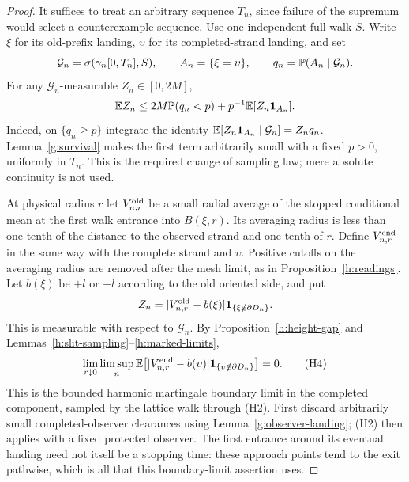 \begin{proof}
It suffices to treat an arbitrary sequence $T_n$, since failure of the
supremum would select a counterexample sequence. Use one independent
full walk $S$. Write $\xi$ for its old-prefix landing, $\upsilon$
for its completed-strand landing, and set
\[
 \mathcal G_n=\sigma(\gamma_n[0,T_n],S),\qquad
 A_n=\{\xi=\upsilon\},\qquad
 q_n=\mathbb P(A_n\mid\mathcal G_n).
\]
For any $\mathcal G_n$-measurable $Z_n\in[0,2M]$,
\begin{equation}\label{h:reweight}
 \mathbb E Z_n\le 2M\mathbb P(q_n<p)+p^{-1}\mathbb E[Z_n\mathbf1_{A_n}].
\end{equation}
Indeed, on $\{q_n\ge p\}$ integrate the identity
$\mathbb E[Z_n\mathbf1_{A_n}\mid\mathcal G_n]=Z_nq_n$.
Lemma~\ref{g:survival} makes the first term arbitrarily small
with a fixed $p>0$, uniformly in $T_n$. This is the required
change of sampling law; mere absolute continuity is not used.

At physical radius $r$ let $V^{\rm old}_{n,r}$ be a small radial
average of the stopped conditional mean at the first walk entrance
into $B(\xi,r)$. Its averaging radius is less than one tenth of
the distance to the observed strand and one tenth of $r$.
Define $V^{\rm end}_{n,r}$ in the same way with the complete strand
and $\upsilon$. Positive cutoffs on the averaging radius are removed
after the mesh limit, as in Proposition~\ref{h:readings}.
Let $b(\xi)$ be $+l$ or $-l$ according to the old oriented side,
and put
\[
 Z_n=|V^{\rm old}_{n,r}-b(\xi)|
                \mathbf1_{\{\xi\notin\partial D_n\}} .
\]
This is measurable with respect to $\mathcal G_n$.
By Proposition~\ref{h:height-gap} and
Lemmas~\ref{h:slit-sampling}--\ref{h:marked-limits},
\[
 \lim_{r\downarrow0}\limsup_n
 \mathbb E\!\left[|V^{\rm end}_{n,r}-b(\upsilon)|
                \mathbf1_{\{\upsilon\notin\partial D_n\}}\right]=0.
 \tag{H4}
\]
This is the bounded harmonic martingale boundary limit in the
completed component, sampled by the lattice walk through (H2).
First discard arbitrarily small completed-observer clearances
using Lemma~\ref{g:observer-landing}; (H2) then applies with a
fixed protected observer.
The first entrance around its eventual landing need not itself
be a stopping time: these approach points tend to the exit
pathwise, which is all that this boundary-limit assertion uses.


\end{proof}
